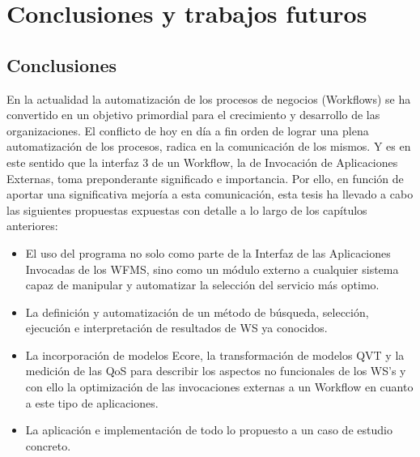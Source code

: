 \chapter{Conclusiones y trabajos futuros}
\label{Conclusiones y trabajos futuros}

\section{Conclusiones}


En la actualidad la automatización de los procesos de negocios (Workflows) se ha convertido en un objetivo primordial para el crecimiento y desarrollo de las organizaciones. El conflicto de hoy en día a fin orden de lograr una plena automatización de los procesos, radica en la comunicación de los mismos. Y es en este sentido que la interfaz 3 de un Workflow, la de Invocación de Aplicaciones Externas, toma preponderante significado e importancia. Por ello, en función de aportar una significativa mejoría a esta comunicación, esta tesis ha llevado a cabo las siguientes propuestas expuestas con detalle a lo largo de los capítulos anteriores:

\begin{itemize}
	\item El uso del programa no solo como parte de la Interfaz de las Aplicaciones Invocadas de los WFMS, sino como un módulo externo a cualquier sistema capaz de manipular y automatizar la selección del servicio más optimo.
	\item La definición y automatización de un método de búsqueda, selección, ejecución e interpretación de resultados de WS ya conocidos.
	\item La incorporación de modelos Ecore, la transformación de modelos QVT y la medición de las QoS para describir los aspectos no funcionales de los WS's y con ello la optimización de las invocaciones externas a un Workflow en cuanto a este tipo de aplicaciones.	
	\item La aplicación e implementación de todo lo propuesto a un caso de estudio concreto.
\end{itemize}

